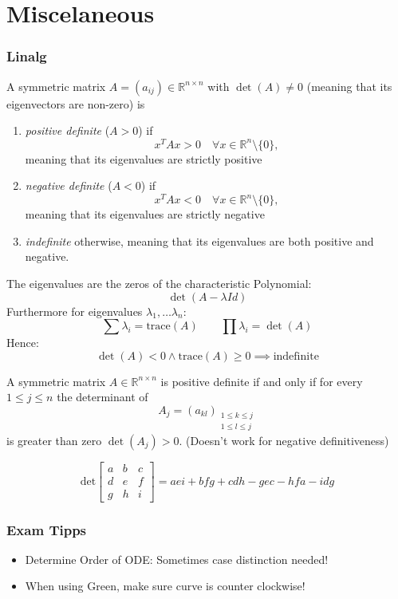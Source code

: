 \part{Miscelaneous}
\setcounter{section}{0}

\section{Linalg}

A symmetric matrix $A = (a_{ij})\in\mathbb{R}^{n\times n}$ with $\det(A)\neq 0$ (meaning that its eigenvectors are non-zero) is 
\begin{enumerate}
    \item \textit{positive definite} ($A>0$) if \begin{equation*}
        x^T A x > 0 \quad \forall x\in\mathbb{R}^n \setminus \{0\},
    \end{equation*}
    meaning that its eigenvalues are strictly positive
    
    \item \textit{negative definite} ($A<0$) if \begin{equation*}
        x^T A x < 0 \quad \forall x\in\mathbb{R}^n \setminus \{0\},
    \end{equation*}
    meaning that its eigenvalues are strictly negative
    
    \item \textit{indefinite} otherwise,     meaning that its eigenvalues are both positive and negative.
\end{enumerate}

\Lemma[Eigenvalues]
The eigenvalues are the zeros of the characteristic Polynomial:
$$\det (A-\lambda Id)$$
Furthermore for eigenvalues $\lambda_1,\dots \lambda_n$:
$$\sum \lambda_i = \text{trace}(A) \quad \quad \prod \lambda_i = \det(A)$$
Hence:
$$ \det(A)<0 \land \text{trace}(A)\geq 0 \implies \text{indefinite}$$

\Theorem[Sylvester]
A symmetric matrix $A\in\mathbb{R}^{n \times n}$ is positive definite if and only if for every $1 \le j \le n$ the determinant of $$A_j = (a_{kl})_{\substack{1\le k \le j\\ 1\le l \le j}}$$ is greater than zero $\det(A_j) >0$. (Doesn't work for negative definitiveness)

\Lemma[Determinant]
$$\text{det} \begin{bmatrix}
a & b & c\\
d & e & f \\
g & h & i
\end{bmatrix}
= aei +bfg +cdh - gec -hfa -idg$$

\section{Exam Tipps}
\begin{itemize}
	\item Determine Order of ODE: Sometimes case distinction needed!
	\item When using Green, make sure curve is counter clockwise!
\end{itemize}